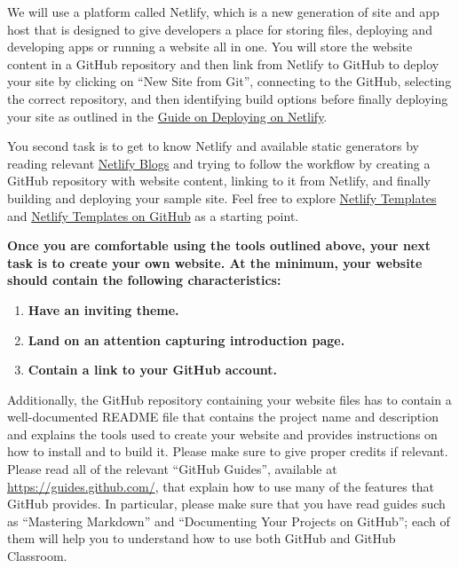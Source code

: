 \documentclass[11pt]{article}
\begin{document}
We will use a platform called Netlify, which  is  a new generation of site and app host that is designed to give developers a place for storing files, deploying and developing apps or running a website all in one. You will store the website content in a GitHub repository and then link from Netlify to GitHub to deploy your site by clicking on ``New Site from Git'', connecting to the GitHub, selecting the correct repository, and then identifying build options before finally deploying your site as outlined in the \href{https://www.netlify.com/blog/2016/09/29/a-step-by-step-guide-deploying-on-netlify/}{Guide on Deploying on Netlify}. 

You second task is to get to know Netlify and available static generators by reading relevant \href{https://www.netlify.com/blog/}{Netlify Blogs} and trying to follow the workflow by creating a  GitHub repository with website content, linking  to it from Netlify, and finally building and deploying your sample site. Feel free to explore \href{https://templates.netlify.com/}{Netlify Templates} and \href{https://github.com/netlify-templates}{Netlify Templates on GitHub} as a starting point.

\textbf{Once you are comfortable using the tools outlined above, your next task is to create your own website. At the minimum, your website should contain the following characteristics: }
\begin{enumerate}
	\item \textbf{Have an inviting theme. }
	\item \textbf{Land on an attention capturing introduction page.}
	\item \textbf{Contain a link to your GitHub account.}
\end{enumerate}

Additionally, the GitHub repository containing your website files has to contain a well-documented README file that contains the project name and description and explains the tools used to create your website and provides instructions on how to install and to build it. Please make sure to give proper credits if relevant. Please read all of the relevant ``GitHub Guides'', available at
\url{https://guides.github.com/}, that explain how to use many of the features that GitHub provides. In particular,
please make sure that you have read guides such as ``Mastering Markdown'' and ``Documenting Your Projects on GitHub'';
each of them will help you to understand how to use both GitHub and GitHub Classroom. 
\end{document}
